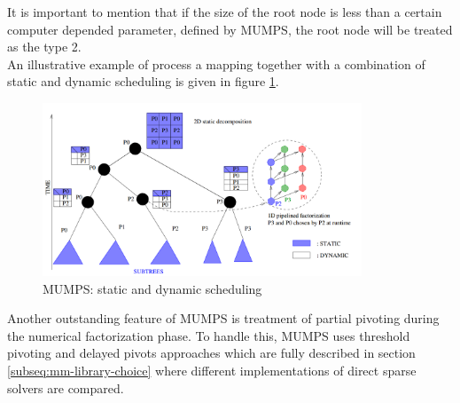 It is important to mention that if the size of the root node is less than a certain computer depended parameter, defined by MUMPS, the root node will be treated as the type 2.\\


An illustrative example of process a mapping together with a combination of static and dynamic scheduling is given in figure \ref{fig:mumps:mapping-and-scheduling}.\\


\begin{figure}[htpb]
  \centering
  \includegraphics[width=0.85\textwidth]{figures/chapter-2/mumps-task-data-parallelism-2.png}
\caption{MUMPS: static and dynamic scheduling \cite{l2012multifrontal}}
\label{fig:mumps:mapping-and-scheduling}
\end{figure}



Another outstanding feature of MUMPS is treatment of partial pivoting during the numerical factorization phase. To handle this, MUMPS uses threshold pivoting and delayed pivots approaches which are fully described in section \ref{subseq:mm-library-choice} where different implementations of direct sparse solvers are compared.\\


